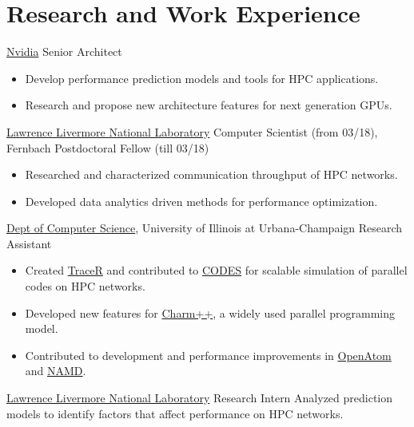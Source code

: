 \section{Research and Work Experience}
		{\href{https://www.nvidia.com/en-us/}{Nvidia}}
		{Senior Architect}
		{}{}
		{
		\begin{itemize}
		\item Develop performance prediction models and tools for HPC applications.
    \item Research and propose new architecture features for next generation
    GPUs.
		\end{itemize}
	  }
		{\href{http://www.llnl.gov}{Lawrence Livermore National Laboratory}}
		{Computer Scientist (from 03/18), Fernbach Postdoctoral Fellow (till 03/18)}
		{}{}
		{
		\begin{itemize}
		\item Researched and characterized communication throughput of HPC networks.
    \item Developed data analytics driven methods for performance optimization.
		\end{itemize}
	  }
		{\href{https://cs.illinois.edu}{Dept of Computer Science}, University of Illinois at Urbana-Champaign}
		{Research Assistant}
		{}{}
		{
		\begin{itemize}
    \item Created \href{https://github.com/LLNL/tracer}{TraceR} and contributed
    to \href{https://xgitlab.cels.anl.gov/codes/codes}{CODES} for scalable simulation of parallel codes on HPC networks.
    \item Developed new features for
    \href{https://charm.cs.illinois.edu}{Charm++}, a widely used parallel programming model.
    \item Contributed to development and performance improvements in
    \href{http://charm.cs.illinois.edu/OpenAtom/}{OpenAtom} and \href{http://www.ks.uiuc.edu/Research/namd}{NAMD}.
		\end{itemize}
    }

		{\href{http://www.llnl.gov}{Lawrence Livermore National Laboratory}}
		{Research Intern}
		{}{}
		{Analyzed prediction models to identify factors that affect performance on HPC networks.}


